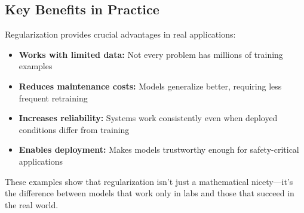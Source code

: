 \subsection{Key Benefits in Practice}

Regularization provides crucial advantages in real applications:
\begin{itemize}
    \item \textbf{Works with limited data:} Not every problem has millions of training examples
    \item \textbf{Reduces maintenance costs:} Models generalize better, requiring less frequent retraining
    \item \textbf{Increases reliability:} Systems work consistently even when deployed conditions differ from training
    \item \textbf{Enables deployment:} Makes models trustworthy enough for safety-critical applications
\end{itemize}

These examples show that regularization isn't just a mathematical nicety—it's the difference between models that work only in labs and those that succeed in the real world.

